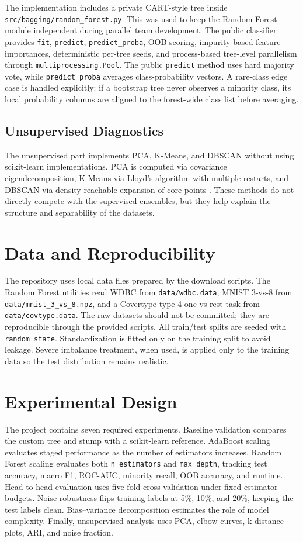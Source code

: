 \documentclass[11pt,twocolumn]{article}
\begin{document}
The implementation includes a private CART-style tree inside \texttt{src/bagging/random\_forest.py}. This was used to keep the Random Forest module independent during parallel team development. The public classifier provides \texttt{fit}, \texttt{predict}, \texttt{predict\_proba}, OOB scoring, impurity-based feature importances, deterministic per-tree seeds, and process-based tree-level parallelism through \texttt{multiprocessing.Pool}. The public \texttt{predict} method uses hard majority vote, while \texttt{predict\_proba} averages class-probability vectors. A rare-class edge case is handled explicitly: if a bootstrap tree never observes a minority class, its local probability columns are aligned to the forest-wide class list before averaging.

\subsection{Unsupervised Diagnostics}
The unsupervised part implements PCA, K-Means, and DBSCAN without using scikit-learn implementations. PCA is computed via covariance eigendecomposition, K-Means via Lloyd's algorithm with multiple restarts, and DBSCAN via density-reachable expansion of core points \cite{pearson1901pca,macqueen1967kmeans,ester1996dbscan}. These methods do not directly compete with the supervised ensembles, but they help explain the structure and separability of the datasets.

\section{Data and Reproducibility}
The repository uses local data files prepared by the download scripts. The Random Forest utilities read WDBC from \texttt{data/wdbc.data}, MNIST 3-vs-8 from \texttt{data/mnist\_3\_vs\_8.npz}, and a Covertype type-4 one-vs-rest task from \texttt{data/covtype.data}. The raw datasets should not be committed; they are reproducible through the provided scripts. All train/test splits are seeded with \texttt{random\_state}. Standardization is fitted only on the training split to avoid leakage. Severe imbalance treatment, when used, is applied only to the training data so the test distribution remains realistic.

\section{Experimental Design}
The project contains seven required experiments. Baseline validation compares the custom tree and stump with a scikit-learn reference. AdaBoost scaling evaluates staged performance as the number of estimators increases. Random Forest scaling evaluates both \texttt{n\_estimators} and \texttt{max\_depth}, tracking test accuracy, macro F1, ROC-AUC, minority recall, OOB accuracy, and runtime. Head-to-head evaluation uses five-fold cross-validation under fixed estimator budgets. Noise robustness flips training labels at 5\%, 10\%, and 20\%, keeping the test labels clean. Bias--variance decomposition estimates the role of model complexity. Finally, unsupervised analysis uses PCA, elbow curves, k-distance plots, ARI, and noise fraction.
\end{document}
